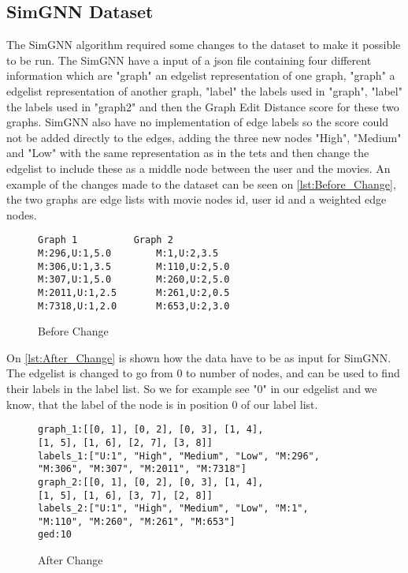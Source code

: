 \subsection{SimGNN Dataset}
The SimGNN algorithm required some changes to the dataset to make it possible to be run. The SimGNN have a input of a json file containing four different information which are "graph" an edgelist representation of one graph, "graph" a edgelist representation of another graph, "label" the labels used in "graph", "label" the labels used in "graph2" and then the Graph Edit Distance score for these two graphs. SimGNN also have no implementation of edge labels so the score could not be added directly to the edges, adding the three new nodes "High", "Medium" and "Low" with the same representation as in the tets and then change the edgelist to include these as a middle node between the user and the movies. 
An example of the changes made to the dataset can be seen on \autoref{lst:Before_Change}, the two graphs are edge lists with movie nodes id, user id and a weighted edge nodes. 
\begin{figure}
\begin{lstlisting}
Graph 1			 Graph 2
M:296,U:1,5.0		 M:1,U:2,3.5
M:306,U:1,3.5		 M:110,U:2,5.0
M:307,U:1,5.0		 M:260,U:2,5.0
M:2011,U:1,2.5 		 M:261,U:2,0.5
M:7318,U:1,2.0		 M:653,U:2,3.0
\end{lstlisting}
\caption{Before Change}
\label{lst:Before_Change}
\end{figure}
On \autoref{lst:After_Change} is shown how the data have to be as input for SimGNN. The edgelist is changed to go from 0 to number of nodes, and can be used to find their labels in the label list. So we for example see "0" in our edgelist and we know, that the label of the node is in position 0 of our label list.
\begin{figure}
\begin{lstlisting}
graph_1:[[0, 1], [0, 2], [0, 3], [1, 4], 
[1, 5], [1, 6], [2, 7], [3, 8]]
labels_1:["U:1", "High", "Medium", "Low", "M:296", 
"M:306", "M:307", "M:2011", "M:7318"]
graph_2:[[0, 1], [0, 2], [0, 3], [1, 4], 
[1, 5], [1, 6], [3, 7], [2, 8]]
labels_2:["U:1", "High", "Medium", "Low", "M:1",
"M:110", "M:260", "M:261", "M:653"]
ged:10
\end{lstlisting}
\caption{After Change}
\label{lst:After_Change}
\end{figure}
